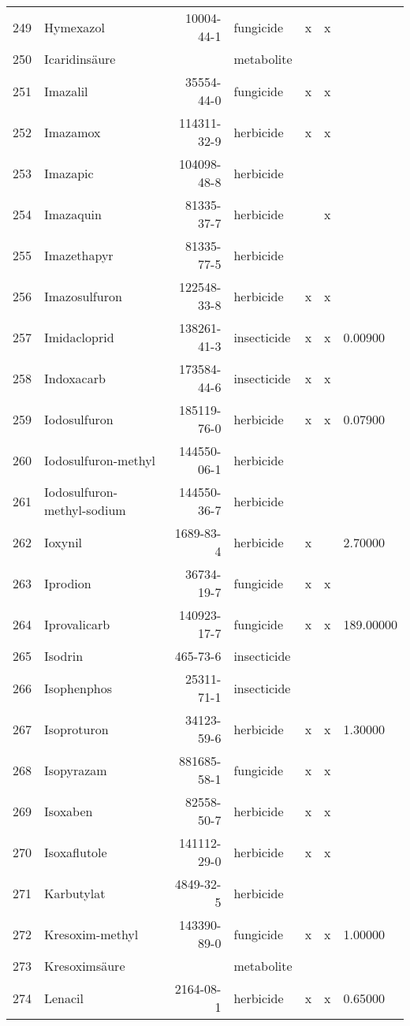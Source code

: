 \begin{longtable}{lp{3cm}rlp{1cm}p{1cm}p{1.5cm}}
  249 & Hymexazol & 10004-44-1 & fungicide & x & x &  \\ 
  250 & Icaridinsäure &  & metabolite &  &  &  \\ 
  251 & Imazalil & 35554-44-0 & fungicide & x & x &  \\ 
  252 & Imazamox & 114311-32-9 & herbicide & x & x &  \\ 
  253 & Imazapic & 104098-48-8 & herbicide &  &  &  \\ 
  254 & Imazaquin & 81335-37-7 & herbicide &  & x &  \\ 
  255 & Imazethapyr & 81335-77-5 & herbicide &  &  &  \\ 
  256 & Imazosulfuron & 122548-33-8 & herbicide & x & x &  \\ 
  257 & Imidacloprid & 138261-41-3 & insecticide & x & x & 0.00900 \\ 
  258 & Indoxacarb & 173584-44-6 & insecticide & x & x &  \\ 
  259 & Iodosulfuron & 185119-76-0 & herbicide & x & x & 0.07900 \\ 
  260 & Iodosulfuron-methyl & 144550-06-1 & herbicide &  &  &  \\ 
  261 & Iodosulfuron-methyl-sodium & 144550-36-7 & herbicide &  &  &  \\ 
  262 & Ioxynil & 1689-83-4 & herbicide & x &  & 2.70000 \\ 
  263 & Iprodion & 36734-19-7 & fungicide & x & x &  \\ 
  264 & Iprovalicarb & 140923-17-7 & fungicide & x & x & 189.00000 \\ 
  265 & Isodrin & 465-73-6 & insecticide &  &  &  \\ 
  266 & Isophenphos & 25311-71-1 & insecticide &  &  &  \\ 
  267 & Isoproturon & 34123-59-6 & herbicide & x & x & 1.30000 \\ 
  268 & Isopyrazam & 881685-58-1 & fungicide & x & x &  \\ 
  269 & Isoxaben & 82558-50-7 & herbicide & x & x &  \\ 
  270 & Isoxaflutole & 141112-29-0 & herbicide & x & x &  \\ 
  271 & Karbutylat & 4849-32-5 & herbicide &  &  &  \\ 
  272 & Kresoxim-methyl & 143390-89-0 & fungicide & x & x & 1.00000 \\ 
  273 & Kresoximsäure &  & metabolite &  &  &  \\ 
  274 & Lenacil & 2164-08-1 & herbicide & x & x & 0.65000 \\ 

\end{longtable}
